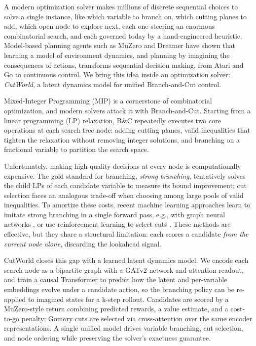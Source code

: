 \documentclass[11pt,a4paper]{article}
\begin{document}
A modern optimization solver makes millions of discrete sequential choices to solve a single instance, like which variable
to branch on, which cutting planes to add, which open node to explore next,
each one steering an enormous combinatorial search, and each governed today by a
hand-engineered heuristic. Model-based planning agents such as MuZero and
Dreamer \citep{schrittwieser2020mastering,hafner2020dream} have shown that
learning a model of environment dynamics, and planning by imagining the
consequences of actions, transforms sequential decision making, from Atari and
Go to continuous control. We bring this idea inside an optimization solver:
\emph{CutWorld}, a latent dynamics model for unified Branch-and-Cut control.

Mixed-Integer Programming (MIP) is a cornerstone of combinatorial optimization,
and modern solvers attack it with Branch-and-Cut. Starting from a linear
programming (LP) relaxation, B\&C repeatedly executes two core operations at
each search tree node: adding cutting planes, valid inequalities that tighten
the relaxation without removing integer solutions, and branching on a fractional
variable to partition the search space.

Unfortunately, making high-quality decisions at every node is computationally
expensive. The gold standard for branching, \emph{strong branching}, tentatively
solves the child LPs of each candidate variable to measure its bound
improvement; cut selection faces an analogous trade-off when choosing among
large pools of valid inequalities. To amortize these costs, recent machine
learning approaches learn to imitate strong branching in a single forward pass,
e.g., with graph neural networks \citep{gasse2019exact,khalil2016learning}, or
use reinforcement learning to select cuts \citep{tang2020reinforcement}. These
methods are effective, but they share a structural limitation: each scores a
candidate \emph{from the current node alone}, discarding the lookahead
signal.

CutWorld closes this gap with a learned latent dynamics model. We encode each
search node as a bipartite graph with a GATv2 network and attention readout,
and train a causal Transformer to predict how the latent and per-variable
embeddings evolve under a candidate action, so the branching policy can be
re-applied to imagined states for a k-step rollout. Candidates are scored by a
MuZero-style return combining predicted rewards, a value estimate, and a
cost-to-go penalty; Gomory cuts are selected via cross-attention over the same
encoder representations. A single unified model drives variable branching, cut
selection, and node ordering while preserving the solver's exactness guarantee.
\end{document}
